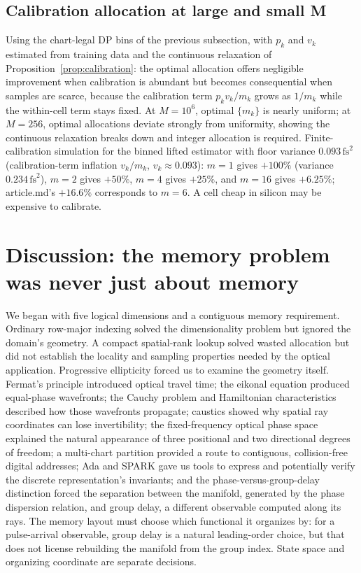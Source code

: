 \documentclass[11pt]{article}
\begin{document}
\subsection{Calibration allocation at large and small M}

Using the chart-legal DP bins of the previous subsection, with $p_k$ and $v_k$ estimated
from training data and the
continuous relaxation of Proposition~\ref{prop:calibration}: the optimal allocation
offers negligible improvement when calibration is abundant but becomes consequential when
samples are scarce, because the calibration term $p_k v_k / m_k$ grows as $1/m_k$ while
the within-cell term stays fixed. At $M = 10^6$, optimal $\{m_k\}$ is nearly uniform;
at $M = 256$, optimal allocations deviate strongly from uniformity, showing the
continuous relaxation breaks down and integer allocation is required. Finite-calibration
simulation for the binned lifted estimator with floor variance
$0.093\,\mathrm{fs}^2$ (calibration-term inflation $v_k/m_k$, $v_k \approx 0.093$):
$m = 1$ gives $+100\%$ (variance $0.234\,\mathrm{fs}^2$), $m = 2$ gives $+50\%$,
$m = 4$ gives $+25\%$, and $m = 16$ gives $+6.25\%$; article.md's $+16.6\%$ corresponds to
$m = 6$. A cell cheap in silicon may be expensive to calibrate.

\section{Discussion: the memory problem was never just about memory}\label{sec:discussion}

We began with five logical dimensions and a contiguous memory requirement. Ordinary
row-major indexing solved the dimensionality problem but ignored the domain's geometry.
A compact spatial-rank lookup solved wasted allocation but did not establish the locality
and sampling properties needed by the optical application. Progressive ellipticity forced
us to examine the geometry itself. Fermat's principle introduced optical travel time; the
eikonal equation produced equal-phase wavefronts; the Cauchy problem and Hamiltonian
characteristics described how those wavefronts propagate; caustics showed why spatial ray
coordinates can lose invertibility; the fixed-frequency optical phase space explained the
natural appearance of three positional and two directional degrees of freedom; a
multi-chart partition provided a route to contiguous, collision-free digital addresses;
Ada and SPARK gave us tools to express and potentially verify the discrete
representation's invariants; and the phase-versus-group-delay distinction forced the
separation between the manifold, generated by the phase dispersion relation, and group
delay, a different observable computed along its rays. The memory layout must choose
which functional it organizes by: for a pulse-arrival observable, group delay is a
natural leading-order choice, but that does not license rebuilding the manifold from the
group index. State space and organizing coordinate are separate decisions.
\end{document}
